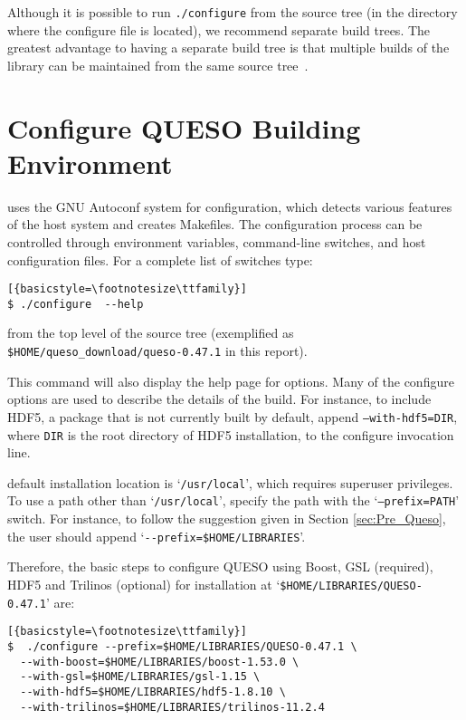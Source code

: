 Although it is possible to run \verb+./configure+ from the source tree (in the directory where the configure file is located), we recommend separate build trees. The greatest advantage to having a separate build tree is that multiple builds of the library
can be maintained from the same source tree~\cite{Trilinos}. 


\section{Configure QUESO Building Environment}\label{sec:Queso_configure}

\Queso{} uses the GNU Autoconf system for configuration, which detects various features of the host system and creates Makefiles. 
The configuration process can be controlled through environment variables, command-line switches, and host configuration files.
For a complete list of switches type:
\begin{lstlisting}[{basicstyle=\footnotesize\ttfamily}]
$ ./configure  --help  
\end{lstlisting}
%
from the top level of the source tree (exemplified as \verb+$HOME/queso_download/queso-0.47.1+ in this report). 

This command will also display the help page for \Queso{} options.  Many of the \Queso{} configure options are used to describe 
the details of the build. For instance, to include HDF5, a package that is not currently built by default, append \texttt{--with-hdf5=DIR}, 
where \texttt{DIR} is the root directory of HDF5 installation,  to the configure invocation line. 

\Queso{} default installation location is `\texttt{/usr/local}', which requires superuser privileges. To use a path
 other than `\texttt{/usr/local}', specify the path with the `\texttt{--prefix=PATH}' switch. For instance, to follow the suggestion
 given in Section \ref{sec:Pre_Queso}, the user should append `\verb+--prefix=$HOME/LIBRARIES+'.



Therefore, the basic steps to configure QUESO using Boost, GSL (required), HDF5 and Trilinos (optional) for installation at `\verb+$HOME/LIBRARIES/QUESO-0.47.1+' are:
\begin{lstlisting}[{basicstyle=\footnotesize\ttfamily}]
$  ./configure --prefix=$HOME/LIBRARIES/QUESO-0.47.1 \
  --with-boost=$HOME/LIBRARIES/boost-1.53.0 \
  --with-gsl=$HOME/LIBRARIES/gsl-1.15 \
  --with-hdf5=$HOME/LIBRARIES/hdf5-1.8.10 \
  --with-trilinos=$HOME/LIBRARIES/trilinos-11.2.4
  \end{lstlisting}

